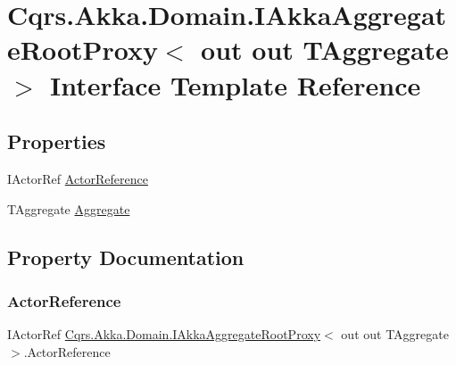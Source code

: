 \hypertarget{interfaceCqrs_1_1Akka_1_1Domain_1_1IAkkaAggregateRootProxy}{}\section{Cqrs.\+Akka.\+Domain.\+I\+Akka\+Aggregate\+Root\+Proxy$<$ out out T\+Aggregate $>$ Interface Template Reference}
\label{interfaceCqrs_1_1Akka_1_1Domain_1_1IAkkaAggregateRootProxy}
\subsection*{Properties}
\begin{DoxyCompactItemize}
\item 
I\+Actor\+Ref \hyperlink{interfaceCqrs_1_1Akka_1_1Domain_1_1IAkkaAggregateRootProxy_a60561a15fa10bec1218bc37d30d8f9a5_a60561a15fa10bec1218bc37d30d8f9a5}{Actor\+Reference}
\item 
T\+Aggregate \hyperlink{interfaceCqrs_1_1Akka_1_1Domain_1_1IAkkaAggregateRootProxy_a97a7315b1dd655f9e71e24dfbde514a8_a97a7315b1dd655f9e71e24dfbde514a8}{Aggregate}
\end{DoxyCompactItemize}


\subsection{Property Documentation}
\mbox{\label{interfaceCqrs_1_1Akka_1_1Domain_1_1IAkkaAggregateRootProxy_a60561a15fa10bec1218bc37d30d8f9a5_a60561a15fa10bec1218bc37d30d8f9a5}} 
\subsubsection{\texorpdfstring{Actor\+Reference}{ActorReference}}
{\footnotesize\ttfamily I\+Actor\+Ref \hyperlink{interfaceCqrs_1_1Akka_1_1Domain_1_1IAkkaAggregateRootProxy}{Cqrs.\+Akka.\+Domain.\+I\+Akka\+Aggregate\+Root\+Proxy}$<$ out out T\+Aggregate $>$.Actor\+Reference\hspace{0.3cm}{\ttfamily [get]}}

